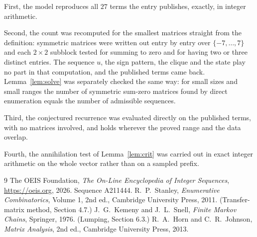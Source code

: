 \documentclass[11pt,a4paper]{article}
\theoremstyle{plain}
\theoremstyle{definition}
\begin{document}
First, the model reproduces all $27$ terms the entry publishes, exactly, in integer
arithmetic.

Second, the count was recomputed for the smallest matrices straight from the definition:
symmetric matrices were written out entry by entry over $\{-7,\dots,7\}$ and each
$2\times2$ subblock tested for summing to zero and for having two or three distinct entries. The
sequence $u$, the sign pattern, the clique and the state play no part in that computation, and
the published terms came back. Lemma~\ref{lem:solve} was separately checked the same way: for
small sizes and small ranges the number of symmetric sum-zero matrices found by direct
enumeration equals the number of admissible sequences.

Third, the conjectured recurrence was evaluated directly on the published terms, with no
matrices involved, and holds wherever the proved range and the data overlap.

Fourth, the annihilation test of Lemma~\ref{lem:crit} was carried out in exact integer
arithmetic on the whole vector rather than on a sampled prefix.

\begin{thebibliography}{9}
 The OEIS Foundation, \emph{The On-Line Encyclopedia of Integer
Sequences}, \url{https://oeis.org}, 2026. Sequence A211444.
 R.~P.~Stanley, \emph{Enumerative Combinatorics}, Volume 1, 2nd ed.,
Cambridge University Press, 2011. (Transfer-matrix method, Section 4.7.)
 J.~G.~Kemeny and J.~L.~Snell, \emph{Finite Markov Chains}, Springer, 1976.
(Lumping, Section 6.3.)
 R.~A.~Horn and C.~R.~Johnson, \emph{Matrix Analysis}, 2nd ed., Cambridge
University Press, 2013.
\end{thebibliography}
\end{document}
